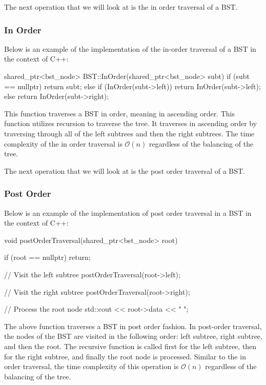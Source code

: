The next operation that we will look at is the in order traversal of a BST.

\begin{highlight}

\subsubsection*{In Order}

Below is an example of the implementation of the in-order traversal of a BST in the context of C++:

\begin{code}
shared_ptr<bst_node> BST::InOrder(shared_ptr<bst_node> subt) {
    if (subt == nullptr) {
        return subt;
    }
    else {
        if (InOrder(subt->left)) {
            return InOrder(subt->left);
        }
        else {
            return InOrder(subt->right);
        }
    }
}
\end{code}

\noindent This function traverses a BST in order, meaning in ascending order. This function utilizes recursion to traverse the tree. It traverses in ascending order by traversing through all of the
left subtrees and then the right subtrees. The time complexity of the in order traversal is $\mathcal{O}(n)$ regardless of the balancing of the tree.

\end{highlight}

The next operation that we will look at is the post order traversal of a BST.

\begin{highlight}

\subsubsection*{Post Order}

Below is an example of the implementation of post order traversal in a BST in the context of C++:

\begin{code}
void postOrderTraversal(shared_ptr<bst_node> root) {
    if (root == nullptr) {
        return;
    }
    
    // Visit the left subtree
    postOrderTraversal(root->left);
    
    // Visit the right subtree
    postOrderTraversal(root->right);
    
    // Process the root node
    std::cout << root->data << " ";
}    
\end{code}

\noindent The above function traverses a BST in post order fashion. In post-order traversal, the nodes of the BST are visited in the following order: left subtree, right subtree, and then the root. 
The recursive function is called first for the left subtree, then for the right subtree, and finally the root node is processed. Similar to the in order traversal, the time complexity of this operation
is $\mathcal{O}(n)$ regardless of the balancing of the tree.

\end{highlight}

